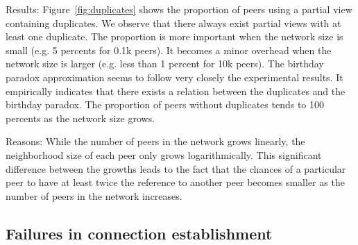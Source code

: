 \begin{asparadesc}
\item[Results:] Figure~\ref{fig:duplicates} shows the proportion of peers using
  a partial view containing duplicates. We observe that there always exist
  partial views with at least one duplicate. The proportion is more important
  when the network size is small (e.g. 5 percents for 0.1k peers). It becomes a
  minor overhead when the network size is larger (e.g. less than 1 percent for
  10k peers). The birthday paradox approximation seems to follow very closely
  the experimental results. It empirically indicates that there exists a
  relation between the duplicates and the birthday paradox. The proportion of
  peers without duplicates tends to 100 percents as the network size grows.
\item[Reasons:] While the number of peers in the network grows linearly, the
  neighborhood size of each peer only grows logarithmically. This significant
  difference between the growths leads to the fact that the chances of a
  particular peer to have at least twice the reference to another peer becomes
  smaller as the number of peers in the network increases.
\end{asparadesc}


\subsection{Failures in connection establishment}
\label{subsec:degeneration}


